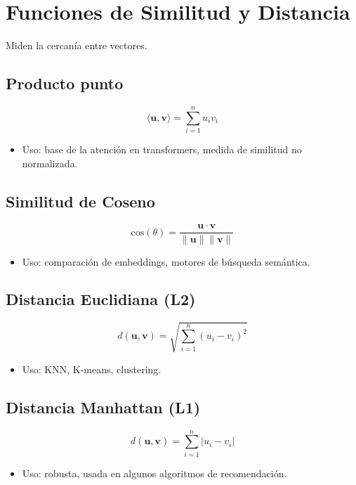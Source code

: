 \documentclass[12pt,a4paper,openany,oneside]{book}
\begin{document}
\section{Funciones de Similitud y Distancia}
Miden la cercanía entre vectores.

\subsection{Producto punto}
\begin{equation*}
\langle \mathbf{u}, \mathbf{v} \rangle = \sum_{i=1}^{n} u_i v_i
\end{equation*}
\begin{itemize}
    \item Uso: base de la atención en transformers, medida de similitud no normalizada.
\end{itemize}

\subsection{Similitud de Coseno}
\begin{equation*}
\text{cos}(\theta) = \frac{\mathbf{u} \cdot \mathbf{v}}{\|\mathbf{u}\| \|\mathbf{v}\|}
\end{equation*}
\begin{itemize}
    \item Uso: comparación de embeddings, motores de búsqueda semántica.
\end{itemize}

\subsection{Distancia Euclidiana (L2)}
\begin{equation*}
d(\mathbf{u},\mathbf{v}) = \sqrt{\sum_{i=1}^{n} (u_i - v_i)^2}
\end{equation*}
\begin{itemize}
    \item Uso: KNN, K-means, clustering.
\end{itemize}

\subsection{Distancia Manhattan (L1)}
\begin{equation*}
d(\mathbf{u},\mathbf{v}) = \sum_{i=1}^{n} |u_i - v_i|
\end{equation*}
\begin{itemize}
    \item Uso: robusta, usada en algunos algoritmos de recomendación.
\end{itemize}
\end{document}
